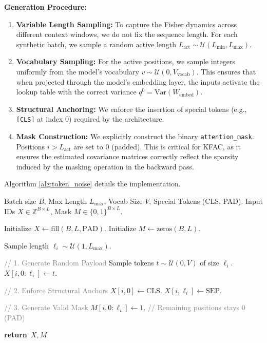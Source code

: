 \documentclass{article}
\theoremstyle{plain}
\theoremstyle{definition}
\theoremstyle{remark}
\newcommand{\RETURN}{\STATE \textbf{return}~}
\begin{document}
\textbf{Generation Procedure:}
\begin{enumerate}
    \item \textbf{Variable Length Sampling:} To capture the Fisher dynamics across different context windows, we do not fix the sequence length. For each synthetic batch, we sample a random active length $L_{\text{act}} \sim \mathcal{U}(L_{\min}, L_{\max})$.
    \item \textbf{Vocabulary Sampling:} For the active positions, we sample integers uniformly from the model's vocabulary $v \sim \mathcal{U}(0, V_{\text{vocab}})$. This ensures that when projected through the model's embedding layer, the inputs activate the lookup table with the correct variance $q^0 = \text{Var}(W_{\text{embed}})$.
    \item \textbf{Structural Anchoring:} We enforce the insertion of special tokens (e.g., \texttt{[CLS]} at index 0) required by the architecture.
    \item \textbf{Mask Construction:} We explicitly construct the binary \texttt{attention\_mask}. Positions $i > L_{\text{act}}$ are set to 0 (padded). This is critical for KFAC, as it ensures the estimated covariance matrices correctly reflect the sparsity induced by the masking operation in the backward pass.
\end{enumerate}

Algorithm \ref{alg:token_noise} details the implementation.

\begin{algorithm}[h]
\caption{Structural Token Noise Generator}
\label{alg:token_noise}
\begin{algorithmic}[1]
\REQUIRE Batch size $B$, Max Length $L_{\max}$, Vocab Size $V$, Special Tokens (CLS, PAD).
\ENSURE Input IDs $X \in \mathbb{Z}^{B \times L}$, Mask $M \in \{0,1\}^{B \times L}$.

\STATE Initialize $X \leftarrow \text{fill}(B, L, \text{PAD})$.
\STATE Initialize $M \leftarrow \text{zeros}(B, L)$.

    \STATE Sample length $\ell_i \sim \mathcal{U}(1, L_{\max})$.
    
    \STATE \textcolor{gray}{// 1. Generate Random Payload}
    \STATE Sample tokens $t \sim \mathcal{U}(0, V)$ of size $\ell_i$.
    \STATE $X[i, 0:\ell_i] \leftarrow t$.
    
    \STATE \textcolor{gray}{// 2. Enforce Structural Anchors}
    \STATE $X[i, 0] \leftarrow \text{CLS}$.
        \STATE $X[i, \ell_i] \leftarrow \text{SEP}$.
    \ENDIF
    
    \STATE \textcolor{gray}{// 3. Generate Valid Mask}
    \STATE $M[i, 0:\ell_i] \leftarrow 1$.
    \STATE \textcolor{gray}{// Remaining positions stays 0 (PAD)}
\ENDFOR

\STATE \RETURN $X, M$ 
\end{algorithmic}
\end{algorithm}
\end{document}
